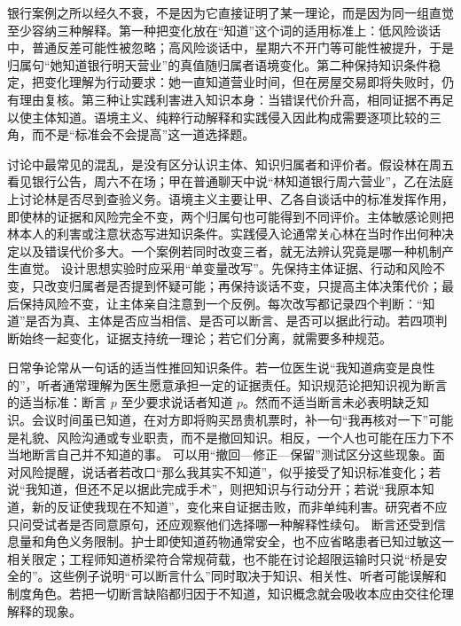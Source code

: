 银行案例之所以经久不衰，不是因为它直接证明了某一理论，而是因为同一组直觉至少容纳三种解释。第一种把变化放在“知道”这个词的适用标准上：低风险谈话中，普通反差可能性被忽略；高风险谈话中，星期六不开门等可能性被提升，于是归属句“她知道银行明天营业”的真值随归属者语境变化。第二种保持知识条件稳定，把变化理解为行动要求：她一直知道营业时间，但在房屋交易即将失败时，仍有理由复核。第三种让实践利害进入知识本身：当错误代价升高，相同证据不再足以使主体知道。语境主义、纯粹行动解释和实践侵入因此构成需要逐项比较的三角，而不是“标准会不会提高”这一道选择题。\parencite{derose1992,hawthorne2004,stanley2005}

讨论中最常见的混乱，是没有区分认识主体、知识归属者和评价者。假设林在周五看见银行公告，周六不在场；甲在普通聊天中说“林知道银行周六营业”，乙在法庭上讨论林是否尽到查验义务。语境主义主要让甲、乙各自谈话中的标准发挥作用，即使林的证据和风险完全不变，两个归属句也可能得到不同评价。主体敏感论则把林本人的利害或注意状态写进知识条件。实践侵入论通常关心林在当时作出何种决定以及错误代价多大。一个案例若同时改变三者，就无法辨认究竟是哪一种机制产生直觉。 设计思想实验时应采用“单变量改写”。先保持主体证据、行动和风险不变，只改变归属者是否提到怀疑可能；再保持谈话不变，只提高主体决策代价；最后保持风险不变，让主体亲自注意到一个反例。每次改写都记录四个判断：“知道”是否为真、主体是否应当相信、是否可以断言、是否可以据此行动。若四项判断始终一起变化，证据支持统一理论；若它们分离，就需要多种规范。

日常争论常从一句话的适当性推回知识条件。若一位医生说“我知道病变是良性的”，听者通常理解为医生愿意承担一定的证据责任。知识规范论把知识视为断言的适当标准：断言 \(p\) 至少要求说话者知道 \(p\)。然而不适当断言未必表明缺乏知识。会议时间虽已知道，在对方即将购买昂贵机票时，补一句“我再核对一下”可能是礼貌、风险沟通或专业职责，而不是撤回知识。相反，一个人也可能在压力下不当地断言自己并不知道的事。 可以用“撤回—修正—保留”测试区分这些现象。面对风险提醒，说话者若改口“那么我其实不知道”，似乎接受了知识标准变化；若说“我知道，但还不足以据此完成手术”，则把知识与行动分开；若说“我原本知道，新的反证使我现在不知道”，变化来自证据击败，而非单纯利害。研究者不应只问受试者是否同意原句，还应观察他们选择哪一种解释性续句。 断言还受到信息量和角色义务限制。护士即使知道药物通常安全，也不应省略患者已知过敏这一相关限定；工程师知道桥梁符合常规荷载，也不能在讨论超限运输时只说“桥是安全的”。这些例子说明“可以断言什么”同时取决于知识、相关性、听者可能误解和制度角色。若把一切断言缺陷都归因于不知道，知识概念就会吸收本应由交往伦理解释的现象。

